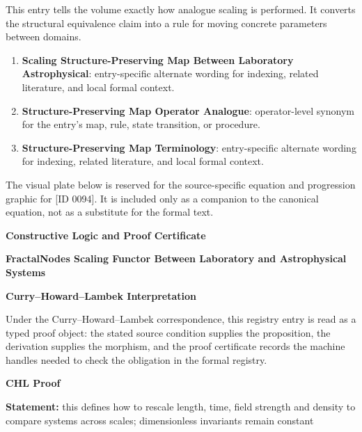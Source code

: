 This entry tells the volume exactly how analogue scaling is performed. It converts the structural equivalence claim into a rule for moving concrete parameters between domains.
\endgroup

\begingroup\footnotesize\sloppy
\begin{enumerate}[leftmargin=1.35em,itemsep=1pt,topsep=1pt,parsep=0pt]
\item \textbf{Scaling Structure-Preserving Map Between Laboratory Astrophysical}: entry-specific alternate wording for indexing, related literature, and local formal context.
\item \textbf{Structure-Preserving Map Operator Analogue}: operator-level synonym for the entry's map, rule, state transition, or procedure.
\item \textbf{Structure-Preserving Map Terminology}: entry-specific alternate wording for indexing, related literature, and local formal context.
\end{enumerate}
\endgroup

\begingroup\footnotesize\sloppy
The visual plate below is reserved for the source-specific equation and progression graphic for [ID 0094]. It is included only as a companion to the canonical equation, not as a substitute for the formal text.
\par\endgroup
\ifTZPDarkEdition
{}
\fi

\clearpage
\begingroup\tzpsupportsetup
\noindent\textbf{\fontsize{10.8pt}{12.8pt}\selectfont [ID 0094] Constructive Logic and Proof Certificate}\par
\noindent\textbf{\fontsize{10pt}{12pt}\selectfont FractalNodes Scaling Functor Between Laboratory and Astrophysical Systems}\par
\vspace{0.45em}
\begingroup
\footnotesize
\setlength{\parskip}{0.22em}
\setlength{\parindent}{0pt}
\noindent\textbf{Curry--Howard--Lambek Interpretation}\par
Under the Curry--Howard--Lambek correspondence, this registry entry is read as a typed proof
object: the stated source condition supplies the proposition, the derivation supplies the
morphism, and the proof certificate records the machine handles needed to check the obligation
in the formal registry.

\vspace{0.45em}
\noindent\textbf{CHL Proof}\par
\textbf{Statement:} this defines how to rescale length, time, field strength and density to compare systems
across scales; dimensionless invariants remain constant

